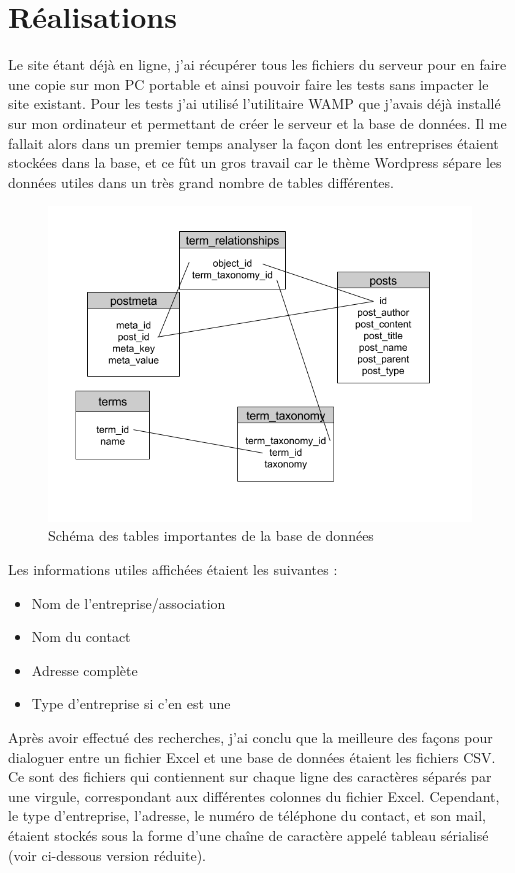 \documentclass[report]{tnreport}
\begin{document}
\section{Réalisations}

Le site étant déjà en ligne, j’ai récupérer tous les fichiers du serveur pour en faire une copie sur mon PC portable et ainsi pouvoir faire les tests sans impacter le site existant. Pour les tests j’ai utilisé l’utilitaire WAMP que j’avais déjà installé sur mon ordinateur et permettant de créer le serveur et la base de données. Il me fallait alors dans un premier temps analyser la façon dont les entreprises étaient stockées dans la base, et ce fût un gros travail car le thème Wordpress sépare les données utiles dans un très grand nombre de tables différentes. 

\begin{figure}[h]
  \centering
  \includegraphics[width=13cm]{figures/Schema_BDD}
  \caption{Schéma des tables importantes de la base de données}
  
  \label{fig:installation}
\end{figure}


Les informations utiles affichées étaient les suivantes :
\begin{itemize}
\item Nom de l’entreprise/association 
\item Nom du contact 
\item Adresse complète
\item Type d’entreprise si c’en est une
\end{itemize}
Après avoir effectué des recherches, j’ai conclu que la meilleure des façons pour dialoguer entre un fichier Excel et une base de données étaient les fichiers CSV. Ce sont des fichiers qui contiennent sur chaque ligne des caractères séparés par une virgule, correspondant aux différentes colonnes du fichier Excel.
Cependant, le type d’entreprise, l’adresse, le numéro de téléphone du contact, et son mail, étaient stockés sous la forme d’une chaîne de caractère appelé tableau sérialisé (voir ci-dessous version réduite).
\end{document}

